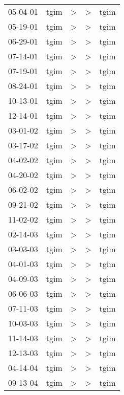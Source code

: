 \begin{supertabular}{lllll}
 05-04-01 &  tgim &  \textgreater &  \textgreater &  tgim \\
 05-19-01 &  tgim &  \textgreater &  \textgreater &  tgim \\
 06-29-01 &  tgim &  \textgreater &  \textgreater &  tgim \\
 07-14-01 &  tgim &  \textgreater &  \textgreater &  tgim \\
 07-19-01 &  tgim &  \textgreater &  \textgreater &  tgim \\
 08-24-01 &  tgim &  \textgreater &  \textgreater &  tgim \\
 10-13-01 &  tgim &  \textgreater &  \textgreater &  tgim \\
 12-14-01 &  tgim &  \textgreater &  \textgreater &  tgim \\
 03-01-02 &  tgim &  \textgreater &  \textgreater &  tgim \\
 03-17-02 &  tgim &  \textgreater &  \textgreater &  tgim \\
 04-02-02 &  tgim &  \textgreater &  \textgreater &  tgim \\
 04-20-02 &  tgim &  \textgreater &  \textgreater &  tgim \\
 06-02-02 &  tgim &  \textgreater &  \textgreater &  tgim \\
 09-21-02 &  tgim &  \textgreater &  \textgreater &  tgim \\
 11-02-02 &  tgim &  \textgreater &  \textgreater &  tgim \\
 02-14-03 &  tgim &  \textgreater &  \textgreater &  tgim \\
 03-03-03 &  tgim &  \textgreater &  \textgreater &  tgim \\
 04-01-03 &  tgim &  \textgreater &  \textgreater &  tgim \\
 04-09-03 &  tgim &  \textgreater &  \textgreater &  tgim \\
 06-06-03 &  tgim &  \textgreater &  \textgreater &  tgim \\
 07-11-03 &  tgim &  \textgreater &  \textgreater &  tgim \\
 10-03-03 &  tgim &  \textgreater &  \textgreater &  tgim \\
 11-14-03 &  tgim &  \textgreater &  \textgreater &  tgim \\
 12-13-03 &  tgim &  \textgreater &  \textgreater &  tgim \\
 04-14-04 &  tgim &  \textgreater &  \textgreater &  tgim \\
 09-13-04 &  tgim &  \textgreater &  \textgreater &  tgim \\

\end{supertabular}

